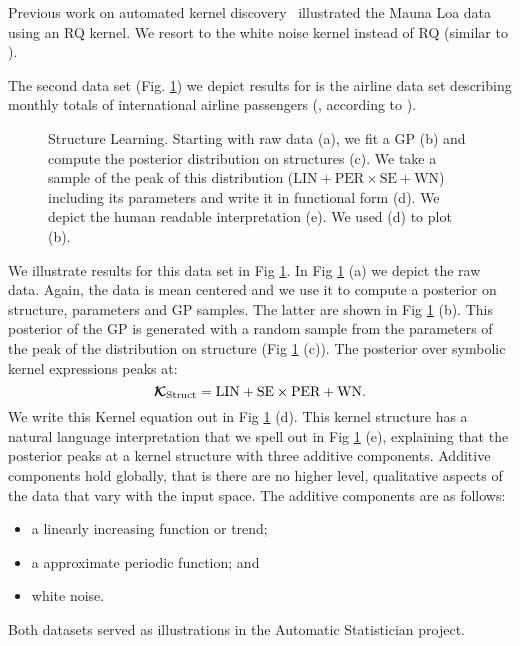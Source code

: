 Previous work on automated kernel discovery~\citep{duvenaud2013structure} illustrated the Mauna Loa data using an RQ kernel.
We resort to the white noise kernel instead of RQ (similar to \citep{lloyd2014automatic}).


The second data set (Fig. \ref{fig:posterior_airline}) we depict results for is  the airline 
data set describing monthly totals of international airline passengers (\citealp{box2011time}, according to \citealp{duvenaud2013structure}). 
\begin{figure}
\centering

\caption{\small Structure Learning. Starting with raw data (a), we fit a \ac{GP}
(b) and compute the posterior distribution on structures (c). We take a sample
of the peak of this distribution ($\text{LIN}+\text{PER} \times \text{SE}+\text{WN}$)
including its parameters and write it in functional form (d). We depict the
human readable interpretation (e). We used (d) to plot (b).}\label{fig:posterior_airline}
\end{figure}

We illustrate results for this data set in Fig \ref{fig:posterior_airline}. In Fig \ref{fig:posterior_airline} (a) we depict the raw data. 
Again, the data is mean centered and we use it to 
compute a posterior on structure, parameters and \ac{GP}
samples.
The latter are shown in  Fig \ref{fig:posterior_airline} (b).
This posterior of the \ac{GP} is generated with a random sample from the parameters
of the peak of the distribution on structure (Fig \ref{fig:posterior_airline} (c)).
The posterior over symbolic kernel expressions peaks at:
\begin{equation}
\bm{\mathcal{K}}_\text{Struct}=\text{LIN} +  \text{SE} \times \text{PER}+ \text{WN}.
\end{equation}
We write this Kernel equation out in Fig \ref{fig:posterior_airline} (d).
This kernel structure has a natural language interpretation that we spell out in
Fig \ref{fig:posterior_airline} (e), explaining that 
the posterior peaks at a kernel structure with three additive components.
Additive components hold globally, that is there are no higher level, qualitative aspects
of the data that vary with the input space.
The additive components are as follows: 
\begin{itemize}
\item a linearly increasing function or trend;
\item a approximate periodic function; and
\item  white noise.
\end{itemize}
Both datasets served as illustrations in the Automatic Statistician project.



